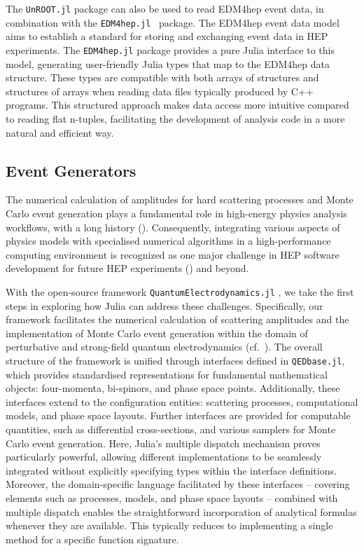 \documentclass{webofc}
\begin{document}
The \texttt{UnROOT.jl} package can also be used to read EDM4hep \cite{EDM4hep:2022leb} event data, in combination with the \texttt{EDM4hep.jl}~\cite{EDM4hep_jl} package. The EDM4hep event data model aims to establish a standard for storing and exchanging event data in HEP experiments. The \texttt{EDM4hep.jl} package provides a pure Julia interface to this model, generating user-friendly Julia types that map to the EDM4hep data structure. These types are compatible with both arrays of structures and structures of arrays when reading data files typically produced by C++ programs. This structured approach makes data access more intuitive compared to reading flat n-tuples, facilitating the development of analysis code in a more natural and efficient way.

\subsection{Event Generators}

The numerical calculation of amplitudes for hard scattering processes and Monte
Carlo event generation plays a fundamental role in high-energy physics analysis
workflows, with a long history (\cite{campbell2024event}). Consequently,
integrating various aspects of physics models with specialised numerical
algorithms in a high-performance computing environment is recognized as one
major challenge in HEP software development for future HEP experiments
(\cite{HEPSoftwareFoundation:2017ggl, HSFPhysicsEventGeneratorWG:2020gxw,
HSFPhysicsEventGeneratorWG:2021xti}) and beyond.

With the open-source framework \texttt{QuantumElectrodynamics.jl}
\cite{qedjl-github}, we take the first steps in exploring how Julia
can address these challenges. Specifically, our framework
facilitates the numerical calculation of scattering amplitudes and the
implementation of Monte Carlo event generation within the domain of perturbative
and strong-field quantum electrodynamics (cf.~\cite{Fedotov:2022ely}). The
overall structure of the framework is unified through interfaces defined in
\texttt{QEDbase.jl}, which provides standardised representations for fundamental
mathematical objects: four-momenta, bi-spinors, and phase space points.
Additionally, these interfaces extend to the configuration entities: 
scattering processes, computational models, and phase space layouts. Further
interfaces are provided for computable quantities, such as differential
cross-sections, and various samplers for Monte Carlo event generation. Here,
Julia’s multiple dispatch mechanism proves particularly powerful, allowing
different implementations to be seamlessly integrated without explicitly
specifying types within the interface definitions. Moreover, the domain-specific
language facilitated by these interfaces -- covering elements such as processes,
models, and phase space layouts -- combined with multiple dispatch enables the
straightforward incorporation of analytical formulas whenever they are
available. This typically reduces to implementing a single method for a specific
function signature.
\end{document}
